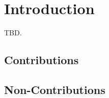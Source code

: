 \chapter{Introduction}
\label{chapter:Introduction}
TBD.

\section{Contributions}
\section{Non-Contributions}